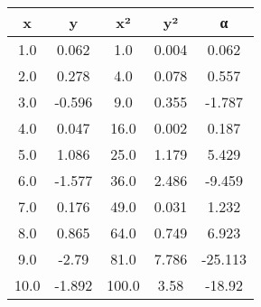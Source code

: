  \begin{tabular}{ccccc}
\toprule
x & y & x² & y² & α\\
\midrule
1.0 & 0.062 & 1.0 & 0.004 & 0.062\\
2.0 & 0.278 & 4.0 & 0.078 & 0.557\\
3.0 & -0.596 & 9.0 & 0.355 & -1.787\\
4.0 & 0.047 & 16.0 & 0.002 & 0.187\\
5.0 & 1.086 & 25.0 & 1.179 & 5.429\\
6.0 & -1.577 & 36.0 & 2.486 & -9.459\\
7.0 & 0.176 & 49.0 & 0.031 & 1.232\\
8.0 & 0.865 & 64.0 & 0.749 & 6.923\\
9.0 & -2.79 & 81.0 & 7.786 & -25.113\\
10.0 & -1.892 & 100.0 & 3.58 & -18.92\\
\bottomrule
\end{tabular}

